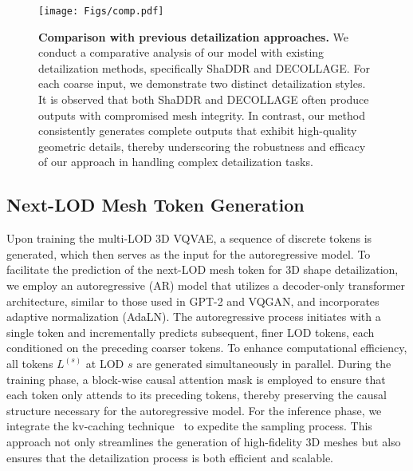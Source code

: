\begin{figure*}
    \centering
    \texttt{[image: Figs/comp.pdf]}
    \caption{\textbf{Comparison with previous detailization approaches.} We conduct a comparative analysis of our model with existing detailization methods, specifically ShaDDR and DECOLLAGE. For each coarse input, we demonstrate two distinct detailization styles. It is observed that both ShaDDR and DECOLLAGE often produce outputs with compromised mesh integrity. In contrast, our method consistently generates complete outputs that exhibit high-quality geometric details, thereby underscoring the robustness and efficacy of our approach in handling complex detailization tasks.}
    \label{fig:comp}
\end{figure*}

\subsection{Next-LOD Mesh Token Generation}
\label{sec:ar}
Upon training the multi-LOD 3D VQVAE, a sequence of discrete tokens is generated, which then serves as the input for the autoregressive model. To facilitate the prediction of the next-LOD mesh token for 3D shape detailization, we employ an autoregressive (AR) model that utilizes a decoder-only transformer architecture, similar to those used in GPT-2 and VQGAN, and incorporates adaptive normalization (AdaLN). The autoregressive process initiates with a single token and incrementally predicts subsequent, finer LOD tokens, each conditioned on the preceding coarser tokens. To enhance computational efficiency, all tokens $L^{(s)}$ at LOD $s$ are generated simultaneously in parallel. During the training phase, a block-wise causal attention mask is employed to ensure that each token only attends to its preceding tokens, thereby preserving the causal structure necessary for the autoregressive model. For the inference phase, we integrate the kv-caching technique~\cite{DBLP:conf/mlsys/PopeDCDBHXAD23} to expedite the sampling process. This approach not only streamlines the generation of high-fidelity 3D meshes but also ensures that the detailization process is both efficient and scalable.

